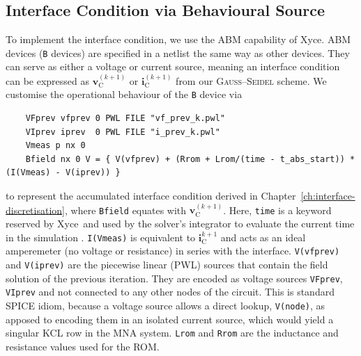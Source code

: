 \subsection{Interface Condition via Behavioural Source} \label{sec:xyce-interface-condition}
To implement the interface condition, we use the ABM capability of Xyce\texttrademark. ABM devices (\lstinline|B| devices) are specified in a netlist the same way as other devices. They can serve as either a voltage or current source, meaning an interface condition can be expressed as $\mathbf{v}_{\text{C}}^{(k+1)}$ or $\mathbf{i}_{\text{C}}^{(k+1)}$ from our \textsc{Gauss--Seidel} scheme. We customise the operational behaviour of the \lstinline|B| device via
\begin{lstlisting}
    VFprev vfprev 0 PWL FILE "vf_prev_k.pwl"
    VIprev iprev  0 PWL FILE "i_prev_k.pwl"
    Vmeas p nx 0
    Bfield nx 0 V = { V(vfprev) + (Rrom + Lrom/(time - t_abs_start)) * (I(Vmeas) - V(iprev)) }
\end{lstlisting}
to represent the accumulated interface condition derived in Chapter~\eqref{ch:interface-discretisation}, where \lstinline|Bfield| equates with $\mathbf{v}_{\text{C}}^{(k+1)}$. Here, \lstinline|time| is a keyword reserved by Xyce\texttrademark \ and used by the solver's integrator to evaluate the current time in the simulation \cite{Keiter2025UG}. \lstinline|I(Vmeas)| is equivalent to $\mathbf{i}_{\text{C}}^{k+1}$ and acts as an ideal amperemeter (no voltage or resistance) in series with the interface. \lstinline|V(vfprev)| and \lstinline|V(iprev)| are the piecewise linear (PWL) sources that contain the field solution of the previous iteration. They are encoded as voltage sources \lstinline|VFprev|, \lstinline|VIprev| and not connected to any other nodes of the circuit. This is standard SPICE idiom, because a voltage source allows a direct lookup, \lstinline|V(node)|, as apposed to encoding them in an isolated current source, which would yield a singular KCL row in the MNA system. \lstinline|Lrom| and \lstinline|Rrom| are the inductance and resistance values used for the ROM. 

